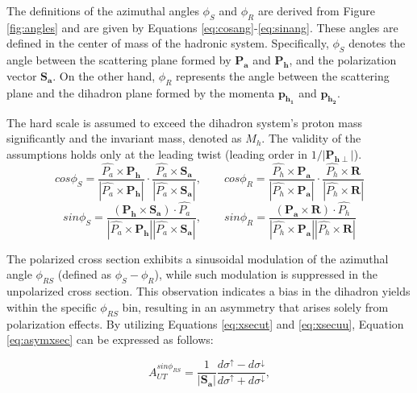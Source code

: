 The definitions of the azimuthal angles $\phi_S$ and $\phi_R$ are derived from Figure \ref{fig:angles} and are given by Equations \ref{eq:cosang}-\ref{eq:sinang}. These angles are defined in the center of mass of the hadronic system. Specifically, $\phi_S$ denotes the angle between the scattering plane formed by $\mathbf{P_a}$ and $\mathbf{P_h}$, and the polarization vector $\mathbf{S_a}$. On the other hand, $\phi_R$ represents the angle between the scattering plane and the dihadron plane formed by the momenta $\mathbf{p_{h_1}}$ and $\mathbf{p_{h_2}}$.

The hard scale is assumed to exceed the dihadron system's proton mass significantly and the invariant mass, denoted as $M_h$. The validity of the assumptions holds only at the leading twist (leading order in $1/|\mathbf{P_{h\perp}}|$).
\begin{equation}
    \label{eq:cosang}
    cos \phi_S = \frac{\hat{P_a}\times \mathbf{P_h}}{|\hat{P_a}\times \mathbf{P_h}|}\cdot \frac{\hat{P_a}\times \mathbf{S_a}}{|\hat{P_a}\times \mathbf{S_a}|}, \hspace{2em}     cos \phi_R = \frac{\hat{P_h}\times \mathbf{P_a}}{|\hat{P_h}\times \mathbf{P_a}|}\cdot \frac{\hat{P_h}\times \mathbf{R}}{|\hat{P_h}\times \mathbf{R}|} 
\end{equation}
\begin{equation}
    \label{eq:sinang}
sin \phi_S = \frac{(\mathbf{P_h}\times \mathbf{S_a})\cdot \hat{P_a}}{|\hat{P_a}\times \mathbf{P_h}||\hat{P_a}\times \mathbf{S_a}|}, \hspace{2em} sin \phi_R = \frac{(\mathbf{P_a}\times \mathbf{R})\cdot \hat{P_h}}{|\hat{P_h}\times \mathbf{P_a}||\hat{P_h}\times \mathbf{R}|}
\end{equation}

The polarized cross section exhibits a sinusoidal modulation of the azimuthal angle $\phi_{RS}$ (defined as $\phi_S - \phi_R$), while such modulation is suppressed in the unpolarized cross section. This observation indicates a bias in the dihadron yields within the specific $\phi_{RS}$ bin, resulting in an asymmetry that arises solely from polarization effects. By utilizing Equations \ref{eq:xsecut} and \ref{eq:xsecuu}, Equation \ref{eq:asymxsec} can be expressed as follows:

\begin{equation}
A_{UT}^{sin\phi_{RS}} = \frac{1}{|\mathbf{S_a}|}\frac{d\sigma^\uparrow - d\sigma^\downarrow}{d\sigma^\uparrow + d\sigma^\downarrow},
\end{equation}

